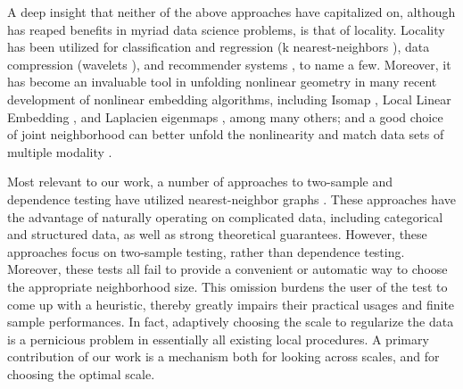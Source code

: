 \documentclass[11pt]{article}
\begin{document}
A deep insight that neither of the above approaches have capitalized on, although has reaped benefits in myriad data science problems, is that of locality.  Locality has been utilized for classification and regression (k nearest-neighbors \cite{Stone1977}), data compression (wavelets \cite{Daubeches}), and recommender systems \cite{Sarwar2000}, to name a few. Moreover, it has become an invaluable tool in unfolding nonlinear geometry in many recent development of nonlinear embedding algorithms, including Isomap \cite{TenenbaumSilvaLangford2000, SilvaTenenbaum2003}, Local Linear Embedding \cite{SaulRoweis2000, RoweisSaul2003}, and Laplacien eigenmaps \cite{BelkinNiyogi2003}, among many others; and a good choice of joint neighborhood can better unfold the nonlinearity and match data sets of multiple modality \cite{ShenVogelsteinPriebe2016}.

Most relevant to our work, a number of approaches to two-sample and dependence testing have utilized nearest-neighbor graphs \cite{David1966,Friedman1983,Schilling1986}.  These approaches have the advantage of naturally operating on complicated data, including categorical and structured data, as well as strong theoretical guarantees. However, these approaches focus on two-sample testing, rather than dependence testing. Moreover, these tests all fail to provide  a convenient or automatic way to choose the appropriate neighborhood size.  This omission burdens the user of the test to come up with a heuristic, thereby greatly impairs their practical usages and finite sample performances. In fact, adaptively choosing the scale to regularize the data is a pernicious problem in essentially all existing local procedures. A primary contribution of our work is a mechanism both for looking across scales, and for choosing the optimal scale.  
\end{document}
